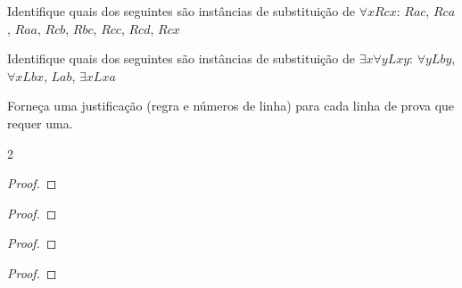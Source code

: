 \solutions
\problempart
\label{pr.subinstanceQL}
\begin{earg}
\item Identifique quais dos seguintes são instâncias de substituição de $\forall x Rcx$: $Rac$, $Rca$, $Raa$, $Rcb$, $Rbc$, $Rcc$, $Rcd$, $Rcx$
\item Identifique quais dos seguintes são instâncias de substituição de $\exists x\forall y Lxy$:
$\forall y Lby$, $\forall x Lbx$, $Lab$, $\exists x Lxa$
\end{earg}



\newpage
\solutions
\problempart
\label{pr.justifyQLproof}
Forneça uma justificação (regra e números de linha) para cada linha de prova que requer uma.
\begin{multicols}{2}
\begin{proof}
	\open
	\close
{} {}
\end{proof}

\begin{proof}
 {}
 {}
\end{proof}


\begin{proof}
\open
\close
{}
\end{proof}





\begin{proof}
	\open
	\close
{} {}
\end{proof}
\end{multicols}

